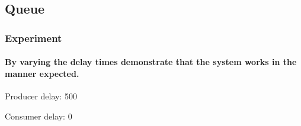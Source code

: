 \subsection{Queue}

\subsubsection*{Experiment}

\paragraph{By varying the delay times demonstrate that the system works in the manner expected.}


Producer delay: 500

Consumer delay: 0

